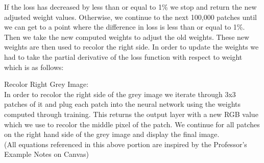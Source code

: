 \documentclass{article}
\theoremstyle{definition}
\begin{document}
        If the loss has decreased by less than or equal to 1\% we stop and return the new adjusted weight values. Otherwise, we continue to the next 100,000 patches until we can get to a point where the difference in loss is less than or equal to 1\%. Then we take the new computed weights to adjust the old weights. These new weights are then used to recolor the right side. In order to update the weights we had to take the partial derivative of the loss function with respect to weight which is as follows:\\
        
        \begin{figure}[H]
            \centering
        \end{figure}
        \begin{figure}[H]
            \centering
        \end{figure}
        
        Recolor Right Grey Image: \\
        In order to recolor the right side of the grey image we iterate through 3x3 patches of it and plug each patch into the neural network using the weights computed through training. This returns the output layer with a new RGB value which we use to recolor the middle pixel of the patch. We continue for all patches on the right hand side of the grey image and display the final image. \\
        
        (All equations referenced in this above portion are inspired by the Professor's Example Notes on Canvas)
        
    \\\\
    
\end{document}
